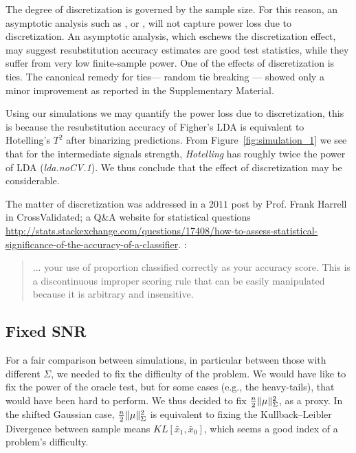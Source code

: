 \documentclass[]{bio}
\begin{document}
The degree of discretization is governed by the sample size. 
For this reason, an asymptotic analysis such as \cite{ramdas_classification_2016}, or \cite{golland_permutation_2005}, will not capture power loss due to discretization. 
An asymptotic analysis, which eschews the discretization effect,  may suggest resubstitution accuracy estimates are good test statistics, while they suffer from very low finite-sample power. 
One of the effects of discretization is ties. 
The canonical remedy for ties--- random tie breaking --- showed only a minor improvement as reported in the Supplementary Material.

Using our simulations we may quantify the power loss due to discretization, this is because the resubstitution accuracy of Figher's LDA is equivalent to Hotelling's $T^2$ after binarizing predictions. 
From Figure~\ref{fig:simulation_1} we see that for the intermediate signals strength, \emph{Hotelling} has roughly twice the power of LDA (\emph{lda.noCV.1}).
We thus conclude that the effect of discretization may be considerable. 


The matter of discretization was addressed in a $2011$ post by Prof. Frank Harrell in \textsf{CrossValidated}; a Q\&A website for statistical questions \url{http://stats.stackexchange.com/questions/17408/how-to-assess-statistical-significance-of-the-accuracy-of-a-classifier}. :
\begin{quote}
	... your use of proportion classified correctly as your accuracy score. This is a discontinuous improper scoring rule that can be easily manipulated because it is arbitrary and insensitive.
\end{quote}






\subsection{Fixed SNR}
\label{sec:fix_snr}

For a fair comparison between simulations, in particular between those with different $\Sigma$, we needed to fix the difficulty of the problem.
We would have like to fix the power of the oracle test, but for some cases (e.g., the heavy-tails), that would have been hard to perform. 
We thus decided to fix $\frac{n}{2}\Vert \mu \Vert^2_\Sigma$, as a proxy.
In the shifted Gaussian case, $\frac{n}{2}\Vert \mu \Vert^2_\Sigma$ is equivalent to fixing the Kullback–Leibler Divergence between sample means $KL[\bar x_1,\bar x_0]$, which seems a good index of a problem's difficulty. 
\end{document}
